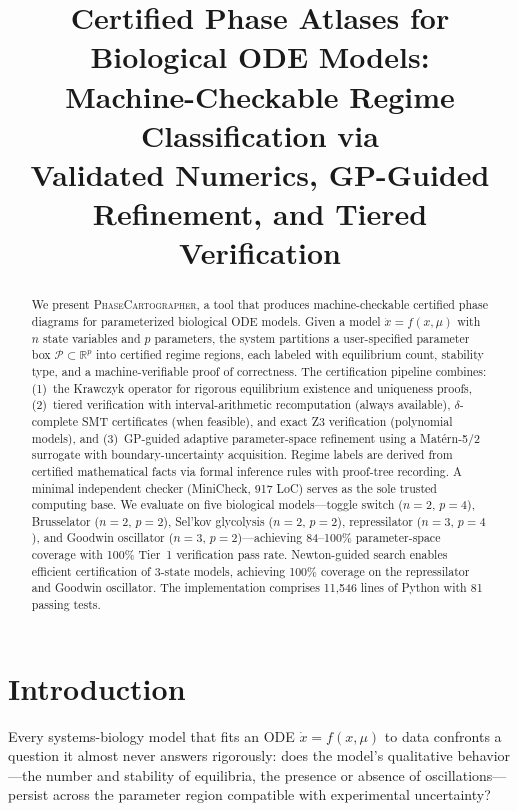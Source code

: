 \documentclass[11pt]{article}
\title{Certified Phase Atlases for Biological ODE Models:\\
Machine-Checkable Regime Classification via\\Validated Numerics, GP-Guided Refinement, and Tiered Verification}
\date{}
\newcommand{\R}{\mathbb{R}}
\newcommand{\PC}{\textsc{PhaseCartographer}}
\begin{document}
\maketitle

\begin{abstract}
We present \PC{}, a tool that produces machine-checkable certified phase diagrams for parameterized biological ODE models.
Given a model $\dot{x} = f(x, \mu)$ with $n$ state variables and $p$ parameters, the system partitions a user-specified parameter box $\mathcal{P} \subset \R^p$ into certified regime regions, each labeled with equilibrium count, stability type, and a machine-verifiable proof of correctness.
The certification pipeline combines: (1)~the Krawczyk operator for rigorous equilibrium existence and uniqueness proofs, (2)~tiered verification with interval-arithmetic recomputation (always available), $\delta$-complete SMT certificates (when feasible), and exact Z3 verification (polynomial models), and (3)~GP-guided adaptive parameter-space refinement using a Mat\'ern-5/2 surrogate with boundary-uncertainty acquisition.
Regime labels are derived from certified mathematical facts via formal inference rules with proof-tree recording.
A minimal independent checker (MiniCheck, 917 LoC) serves as the sole trusted computing base.
We evaluate on five biological models---toggle switch ($n{=}2$, $p{=}4$), Brusselator ($n{=}2$, $p{=}2$), Sel'kov glycolysis ($n{=}2$, $p{=}2$), repressilator ($n{=}3$, $p{=}4$), and Goodwin oscillator ($n{=}3$, $p{=}2$)---achieving 84--100\% parameter-space coverage with 100\% Tier~1 verification pass rate.
Newton-guided search enables efficient certification of 3-state models, achieving 100\% coverage on the repressilator and Goodwin oscillator.
The implementation comprises 11,546 lines of Python with 81 passing tests.
\end{abstract}

\section{Introduction}
\label{sec:intro}

Every systems-biology model that fits an ODE $\dot{x} = f(x, \mu)$ to data confronts a question it almost never answers rigorously: does the model's qualitative behavior---the number and stability of equilibria, the presence or absence of oscillations---persist across the parameter region compatible with experimental uncertainty?
\end{document}
